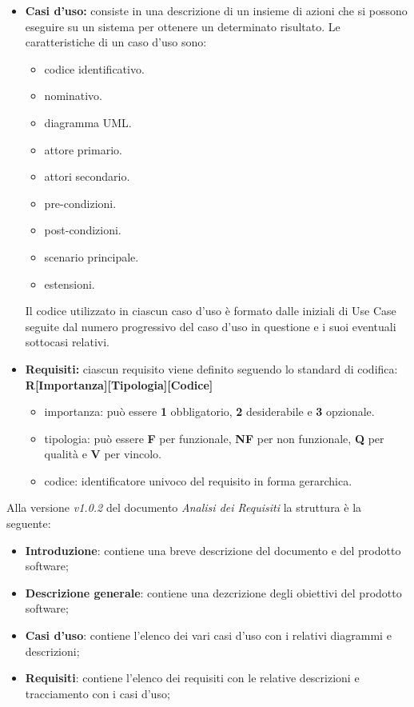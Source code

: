     \begin{itemize}
        \item \textbf{Casi d'uso:} consiste in una descrizione di un insieme di azioni che si possono eseguire su un sistema per ottenere un determinato risultato.
        Le caratteristiche di un caso d'uso sono:
        \begin{itemize}
            \item {codice identificativo.}
            \item {nominativo.}
            \item {diagramma UML.}
            \item {attore primario.}
            \item {attori secondario.}
            \item {pre-condizioni.}
            \item {post-condizioni.}
            \item {scenario principale.}
            \item {estensioni.}
        \end{itemize}
        Il codice utilizzato in ciascun caso d'uso è formato dalle iniziali di Use Case seguite dal numero progressivo del caso d'uso in questione e i suoi eventuali sottocasi relativi.
        \item \textbf{Requisiti:} ciascun requisito viene definito seguendo lo standard di codifica:\\
        \textbf{R[Importanza][Tipologia][Codice]}
        \begin {itemize}
            \item{importanza:} può essere \textbf{1} obbligatorio, \textbf{2} desiderabile e \textbf{3} opzionale.
            \item {tipologia:} può essere \textbf{F} per funzionale, \textbf{NF} per non funzionale, \textbf{Q} per qualità e \textbf{V} per vincolo.
            \item {codice:} identificatore univoco del requisito in forma gerarchica.
        \end {itemize}
    \end{itemize}

    Alla versione \textit{v1.0.2} del documento \textit{Analisi dei Requisiti} la struttura è la seguente:
    \begin{itemize}
        \item \textbf{Introduzione}: contiene una breve descrizione del documento e del prodotto software;
        \item \textbf{Descrizione generale}: contiene una dezcrizione degli obiettivi del prodotto software;
        \item \textbf{Casi d'uso}: contiene l'elenco dei vari casi d'uso con i relativi diagrammi e descrizioni;
        \item \textbf{Requisiti}: contiene l'elenco dei requisiti con le relative descrizioni e tracciamento con i casi d'uso;
    \end{itemize}

